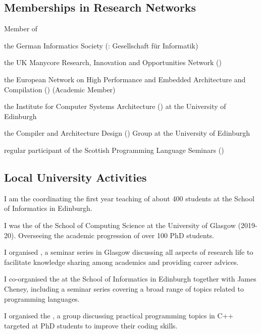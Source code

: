 \subsection{Memberships in Research Networks}
\begin{cvitemize}
    \item Member of
      \begin{inlineItemize}
        \item {}
        \item the German Informatics Society (\@: {\footnotesize Gesellschaft f{\"u}r Informatik})
        \item the UK Manycore Research, Innovation and Opportunities Network ()
        \item the European Network on High Performance and Embedded Architecture and Compilation () (Academic Member)
        \item the Institute for Computer Systems Architecture () at the University of Edinburgh
        \item the Compiler and Architecture Design () Group at the University of Edinburgh
        \item regular participant of the Scottish Programming Language Seminars ()
      \end{inlineItemize}
\end{cvitemize}

\subsection{Local University Activities}
\begin{cvitemize}
  \item I am the  coordinating the first year teaching of about 400 students at the School of Informatics in Edinburgh.
  \item I was the  of the School of Computing Science at the University of Glasgow ({\small 2019-20}).
        Overseeing the academic progression of over 100 PhD students.
  \item I organised , a seminar series in Glasgow discussing all aspects of research life to facilitate knowledge sharing among academics and providing career advices.
  \item I co-organised the  at the School of Informatics in Edinburgh together with James Cheney, including a seminar series covering a broad range of topics related to programming languages.
  \item I organised the , a group discussing practical programming topics in C++ targeted at PhD students to improve their coding skills.
\end{cvitemize}
